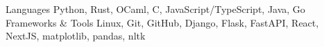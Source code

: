 

\begin{cvskills}

  \cvskill
    {Languages}
    {Python, Rust, OCaml, C, JavaScript/TypeScript, Java, Go}
  \cvskill
    {Frameworks \& Tools}
    {Linux, Git, GitHub, Django, Flask, FastAPI, React, NextJS, matplotlib, pandas, nltk}
\end{cvskills}